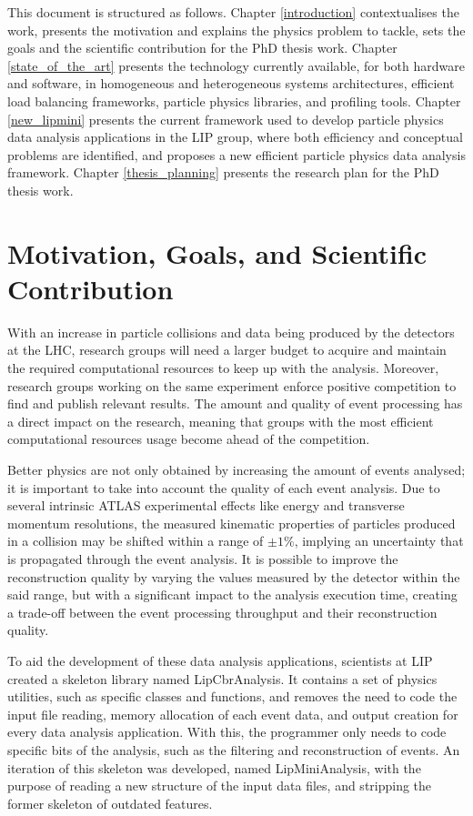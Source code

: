 This document is structured as follows. Chapter \ref{introduction} contextualises the work, presents the motivation and explains the physics problem to tackle, sets the goals and the scientific contribution for the PhD thesis work. Chapter \ref{state_of_the_art} presents the technology currently available, for both hardware and software, in homogeneous and heterogeneous systems architectures, efficient load balancing frameworks, particle physics libraries, and profiling tools. Chapter \ref{new_lipmini} presents the current framework used to develop particle physics data analysis applications in the LIP group, where both efficiency and conceptual problems are identified, and proposes a new efficient particle physics data analysis framework. Chapter \ref{thesis_planning} presents the research plan for the PhD thesis work.

\section{Motivation, Goals, and Scientific Contribution}
\label{motivation}

With an increase in particle collisions and data being produced by the detectors at the LHC, research groups will need a larger budget to acquire and maintain the required computational resources to keep up with the analysis. Moreover, research groups working on the same experiment enforce positive competition to find and publish relevant results. The amount and quality of event processing has a direct impact on the research, meaning that groups with the most efficient computational resources usage become ahead of the competition.

Better physics are not only obtained by increasing the amount of events analysed; it is important to take into account the quality of each event analysis. Due to several intrinsic ATLAS experimental effects like energy and transverse momentum resolutions, the measured kinematic properties of particles produced in a collision may be shifted within a range of $\pm1\%$, implying an uncertainty that is propagated through the event analysis. It is possible to improve the reconstruction quality by varying the values measured by the detector within the said range, but with a significant impact to the analysis execution time, creating a trade-off between the event processing throughput and their reconstruction quality.

To aid the development of these data analysis applications, scientists at LIP created a skeleton library named LipCbrAnalysis. It contains a set of physics utilities, such as specific classes and functions, and removes the need to code the input file reading, memory allocation of each event data, and output creation for every data analysis application. With this, the programmer only needs to code specific bits of the analysis, such as the filtering and reconstruction of events. An iteration of this skeleton was developed, named LipMiniAnalysis, with the purpose of reading a new structure of the input data files, and stripping the former skeleton of outdated features.

